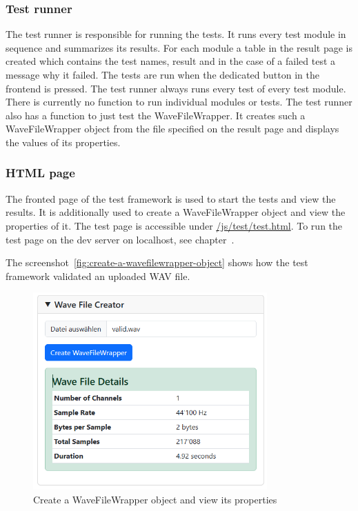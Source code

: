 \subsubsection{Test runner}
The test runner is responsible for running the tests.
It runs every test module in sequence and summarizes its results.
For each module a table in the result page is created which contains the test names, result and in the case of a failed test a message why it failed.
The tests are run when the dedicated button in the frontend is pressed.
The test runner always runs every test of every test module.
There is currently no function to run individual modules or tests.
The test runner also has a function to just test the WaveFileWrapper.
It creates such a WaveFileWrapper object from the file specified on the result page and displays the values of its properties.

\subsubsection{HTML page}
The fronted page of the test framework is used to start the tests and view the results.
It is additionally used to create a WaveFileWrapper object and view the properties of it.
The test page is accessible under \href{https://decibel-threshold-event-displayer.github.io/js/test/test.html}{/js/test/test.html}.
To run the test page on the dev server on localhost, see chapter~.

The screenshot~\autoref{fig:create-a-wavefilewrapper-object} shows how the test framework validated an uploaded WAV file.
\begin{figure}[H]
    \centering
    \includegraphics[width=0.8\textwidth]{../assets/wavefilecreator.png}
    \caption{Create a WaveFileWrapper object and view its properties}\label{fig:create-a-wavefilewrapper-object}
\end{figure}

